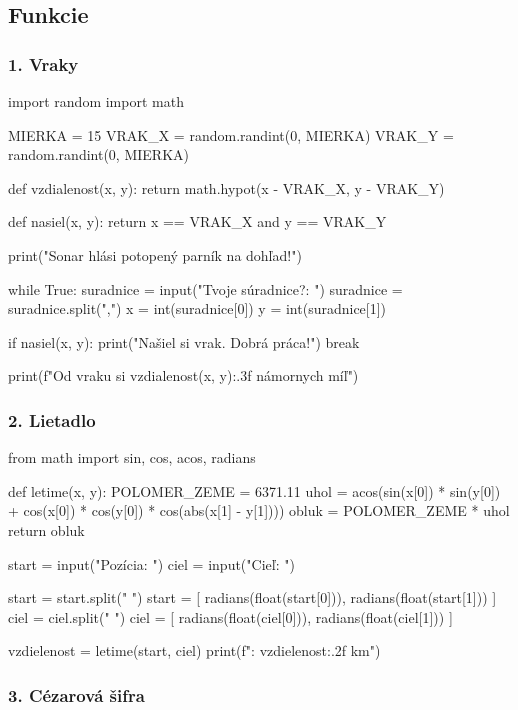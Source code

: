 \subsection{Funkcie}

\subsubsection*{1. Vraky}

\begin{solution}
import random
import math

MIERKA = 15
VRAK_X = random.randint(0, MIERKA)
VRAK_Y = random.randint(0, MIERKA)


def vzdialenost(x, y):
    return math.hypot(x - VRAK_X, y - VRAK_Y)


def nasiel(x, y):
    return x == VRAK_X and y == VRAK_Y


print("Sonar hlási potopený parník na dohľad!")

while True:
    suradnice = input("Tvoje súradnice?: ")
    suradnice = suradnice.split(",")
    x = int(suradnice[0])
    y = int(suradnice[1])

    if nasiel(x, y):
        print("Našiel si vrak. Dobrá práca!")
        break

    print(f"Od vraku si {vzdialenost(x, y):.3f} námornych míľ")
\end{solution}


\subsubsection*{2. Lietadlo}

\begin{solution}
from math import sin, cos, acos, radians

def letime(x, y):
    POLOMER_ZEME = 6371.11
    uhol = acos(sin(x[0]) * sin(y[0]) +
                cos(x[0]) * cos(y[0]) * cos(abs(x[1] - y[1])))
    obluk = POLOMER_ZEME * uhol
    return obluk


start = input("Pozícia: ")
ciel = input("Cieľ: ")

start = start.split(" ")
start = [
    radians(float(start[0])),
    radians(float(start[1]))
]
ciel = ciel.split(" ")
ciel = [
    radians(float(ciel[0])),
    radians(float(ciel[1]))
]

vzdielenost = letime(start, ciel)
print(f": {vzdielenost:.2f} km")
\end{solution}


\subsubsection*{3. Cézarová šifra}

